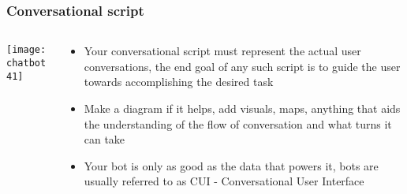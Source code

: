 \begin{frame}[fragile]\frametitle{Conversational script}
    \begin{columns}
    \begin{column}[t]{0.5\linewidth}
\begin{center}
\texttt{[image: chatbot41]}
\end{center}

\end{column}
    \begin{column}[t]{0.5\linewidth}

\begin{itemize}
\item Your conversational script must represent the actual user conversations, the end goal of any such script is to guide the user towards accomplishing the desired task
\item Make a diagram if it helps, add visuals, maps, anything that aids the understanding of the flow of conversation and what turns it can take
\item Your bot is only as good as the data that powers it, bots are usually referred to as CUI - Conversational User Interface

\end{itemize}
\end{column}
\end{columns}
\end{frame}


